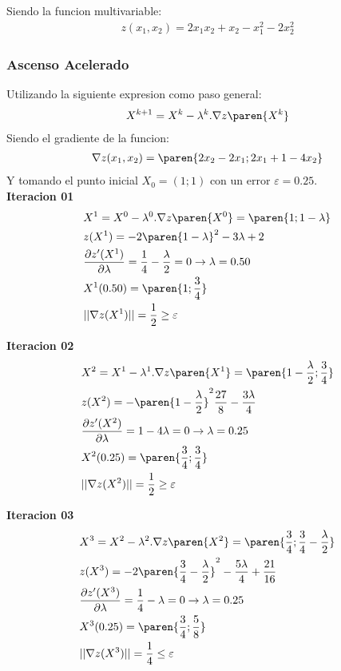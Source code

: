 \begin{homeworkProblem}
Siendo la funcion multivariable:
\begin{align*}
    z(x_1,x_2)=2x_1x_2+x_2-x_1^2-2x_2^2
\end{align*}

\subsubsection{Ascenso Acelerado}
Utilizando la siguiente expresion como paso general:
\begin{align*}
    X^{k+1}=X^k-\lambda^k.\nabla z\paren{X^k}
\end{align*} 
Siendo el gradiente de la funcion:
\begin{align*}
    \nabla z(x_1,x_2)=\paren{2x_2-2x_1;2x_1+1-4x_2}
\end{align*}
Y tomando el punto inicial $X_0=(1;1)$ con un error $\varepsilon=0.25$.\\

\textbf{Iteracion 01}\\
\begin{align*}
    &X^{1}=X^0-\lambda^0.\nabla z\paren{X^0}=\paren{1;1-\lambda}\\
    &z(X^1)=-2\paren{1-\lambda}^2-3\lambda +2 \\
    &\frac{\partial z'(X^1) }{\partial \lambda}=
        \frac{1}{4}-\frac{\lambda}{2}= 0 
        \rightarrow \lambda = 0.50\\
    &X^1(0.50)=\paren{1;\frac{3}{4}}\\
    &||\nabla z(X^1)|| = \frac{1}{2} \geq \varepsilon
\end{align*}

\textbf{Iteracion 02}\\
\begin{align*}
    &X^{2}=X^1-\lambda^1.\nabla z\paren{X^1}=\paren{1-\frac{\lambda}{2};\frac{3}{4}}\\
    &z(X^2)=-\paren{1-\frac{\lambda}{2}}^2\frac{27}{8} -\frac{3\lambda}{4} \\
    &\frac{\partial z'(X^2) }{\partial \lambda}=
        1-4\lambda= 0 
        \rightarrow \lambda = 0.25\\
    &X^2(0.25)=\paren{\frac{3}{4};\frac{3}{4}}\\
    &||\nabla z(X^2)|| = \frac{1}{2} \geq \varepsilon
\end{align*}


\textbf{Iteracion 03}\\
\begin{align*}
    &X^3=X^2-\lambda^2.\nabla z\paren{X^2}=\paren{\frac{3}{4};\frac{3}{4} - \frac{\lambda}{2}}\\
    &z(X^3)=-2\paren{\frac{3}{4}-\frac{\lambda}{2}}^2
            -\frac{5\lambda}{4} + \frac{21}{16} \\
    &\frac{\partial z'(X^3) }{\partial \lambda}=
        \frac{1}{4}-\lambda= 0 
        \rightarrow \lambda = 0.25\\
    &X^3(0.25)=\paren{\frac{3}{4};\frac{5}{8}}\\
    &||\nabla z(X^3)|| = \frac{1}{4} \leq \varepsilon
\end{align*}


\end{homeworkProblem}
